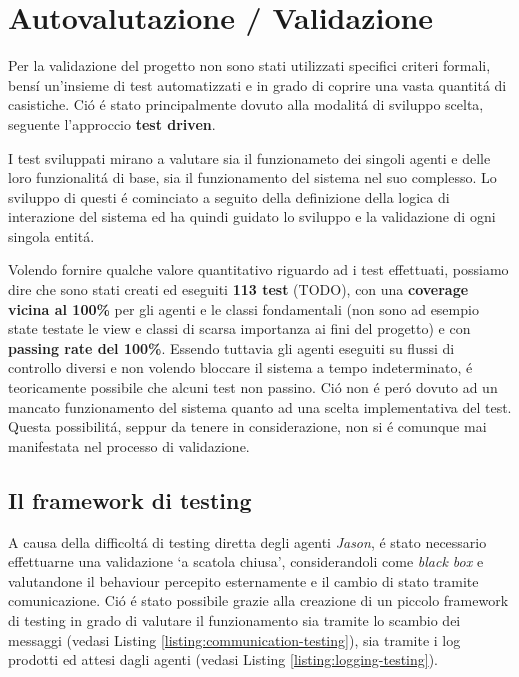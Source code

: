 \section{Autovalutazione / Validazione}



Per la validazione del progetto non sono stati utilizzati specifici criteri formali, bens\'i un’insieme di test automatizzati e in grado di coprire una vasta quantit\'a di casistiche. Ci\'o \'e stato principalmente dovuto alla modalit\'a di sviluppo scelta, seguente l'approccio \textbf{test driven}.

I test sviluppati mirano a valutare sia il funzionameto dei singoli agenti e delle loro funzionalit\'a di base, sia il funzionamento del sistema nel suo complesso. Lo sviluppo di questi \'e cominciato a seguito della definizione della logica di interazione del sistema ed ha quindi guidato lo sviluppo e la validazione di ogni singola entit\'a.

Volendo fornire qualche valore quantitativo riguardo ad i test effettuati, possiamo dire che sono stati creati ed eseguiti \textbf{113 test} (TODO), con una \textbf{coverage vicina al 100\%} per gli agenti e le classi fondamentali (non sono ad esempio state testate le view e classi di scarsa importanza ai fini del progetto) e con \textbf{passing rate del 100\%}. Essendo tuttavia gli agenti eseguiti su flussi di controllo diversi e non volendo bloccare il sistema a tempo indeterminato, \'e teoricamente possibile che alcuni test non passino. Ci\'o non \'e per\'o dovuto ad un mancato funzionamento del sistema quanto ad una scelta implementativa del test. Questa possibilit\'a, seppur da tenere in considerazione, non si \'e comunque mai manifestata nel processo di validazione.

\subsection{Il framework di testing}
A causa della difficolt\'a di testing diretta degli agenti \textit{Jason}, \'e stato necessario effettuarne una validazione `a scatola chiusa', considerandoli come \textit{black box} e valutandone il behaviour percepito esternamente e il cambio di stato tramite comunicazione. Ci\'o \'e stato possibile grazie alla creazione di un piccolo framework di testing in grado di valutare il funzionamento sia tramite lo scambio dei messaggi (vedasi Listing \ref{listing:communication-testing}), sia tramite i log prodotti ed attesi dagli agenti (vedasi Listing \ref{listing:logging-testing}).

